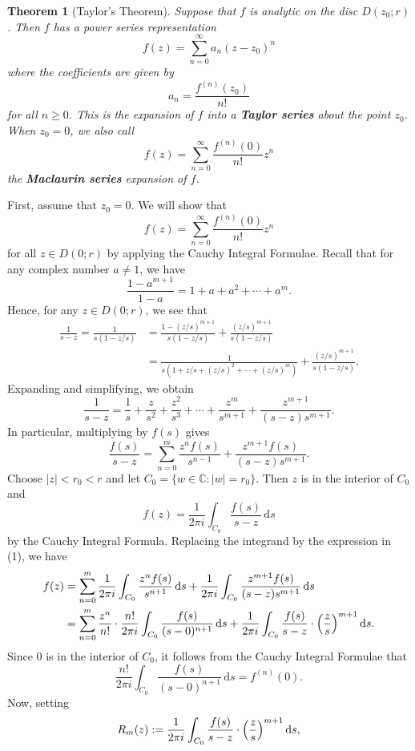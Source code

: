 \documentclass[10pt]{article}
\makeatletter
\newcommand{\C}{\mathbb{C}}
\newcommand{\dd}{\,\mathrm{d}}
\theoremstyle{newstyle}
\newtheorem{thm}{Theorem}[section]
\newenvironment{pf}[1][\proofname]{\par
  \pushQED{\qed}%
  \normalfont \topsep0\p@\relax
  \trivlist
  \item[\hskip\labelsep\scshape
  #1\@addpunct{.}]\ignorespaces
}{%
  \popQED\endtrivlist\@endpefalse
}
\makeatother
\begin{document}
\begin{thm}[Taylor's Theorem]
Suppose that $f$ is analytic on the disc $D(z_0; r)$. Then $f$ has a power series 
representation 
\[ f(z) = \sum_{n=0}^\infty a_n(z-z_0)^n \]
where the coefficients are given by 
\[ a_n = \frac{f^{(n)}(z_0)}{n!} \]
for all $n \geq 0$. This is the expansion of $f$ into a {\bf Taylor series} about the point $z_0$. 
When $z_0 = 0$, we also call 
\[ f(z) = \sum_{n=0}^\infty \frac{f^{(n)}(0)}{n!} z^n \]
the {\bf Maclaurin series} expansion of $f$. 
\end{thm}
\begin{pf}
First, assume that $z_0 = 0$. We will show that 
\[ f(z) = \sum_{n=0}^\infty \frac{f^{(n)}(0)}{n!} z^n \]
for all $z \in D(0; r)$ by applying the Cauchy Integral Formulae. Recall that for any 
complex number $a \neq 1$, we have 
\[ \frac{1-a^{m+1}}{1-a} = 1 + a + a^2 + \cdots + a^m. \]
Hence, for any $z \in D(0; r)$, we see that 
\begin{align*}
    \frac{1}{s-z} = \frac{1}{s(1-z/s)} 
    &= \frac{1-(z/s)^{m+1}}{s(1-z/s)} + \frac{(z/s)^{m+1}}{s(1-z/s)} \\
    &= \frac{1}{s(1+z/s + (z/s)^2 + \cdots + (z/s)^m)} + \frac{(z/s)^{m+1}}{s(1-z/s)}. 
\end{align*}
Expanding and simplifying, we obtain 
\[ \frac{1}{s-z} = \frac1s + \frac{z}{s^2} + \frac{z^2}{s^3} + \cdots + \frac{z^m}{s^{m+1}} 
+ \frac{z^{m+1}}{(s-z)s^{m+1}}. \]
In particular, multiplying by $f(s)$ gives 
\[ \frac{f(s)}{s-z} = \sum_{n=0}^m \frac{z^nf(s)}{s^{n-1}} + \frac{z^{m+1}f(s)}{(s-z)s^{m+1}}. 
\tag{1} \]
Choose $|z| < r_0 < r$ and let $C_0 = \{w \in \C : |w| = r_0\}$. Then $z$ is in the interior of 
$C_0$ and 
\[ f(z) = \frac{1}{2\pi i} \int_{C_0} \frac{f(s)}{s-z}\dd s \]
by the Cauchy Integral Formula. Replacing the integrand by the expression in (1), we have 
\begin{align*}
    f(z) &= 
    \sum_{n=0}^m \frac{1}{2\pi i} \int_{C_0} \frac{z^n f(s)}{s^{n+1}}\dd s + 
    \frac{1}{2\pi i} \int_{C_0} \frac{z^{m+1} f(s)}{(s-z)s^{m+1}} \dd s \\
    &= \sum_{n=0}^m \frac{z^n}{n!} \cdot \frac{n!}{2\pi i} \int_{C_0} \frac{f(s)}{(s-0)^{n+1}}\dd s 
    + \frac{1}{2\pi i} \int_{C_0} \frac{f(s)}{s-z} \cdot \left( \frac{z}{s} \right)^{m+1} {\rm d}s. 
\end{align*}
Since $0$ is in the interior of $C_0$, it follows from the Cauchy Integral Formulae that 
\[ \frac{n!}{2\pi i} \int_{C_0} \frac{f(s)}{(s-0)^{n+1}}\dd s = f^{(n)}(0). \]
Now, setting 
\[ R_m(z) := \frac{1}{2\pi i} \int_{C_0} \frac{f(s)}{s-z} \cdot \left( \frac zs \right)^{m+1}{\rm d}s, \]

\end{pf}
\end{document}
